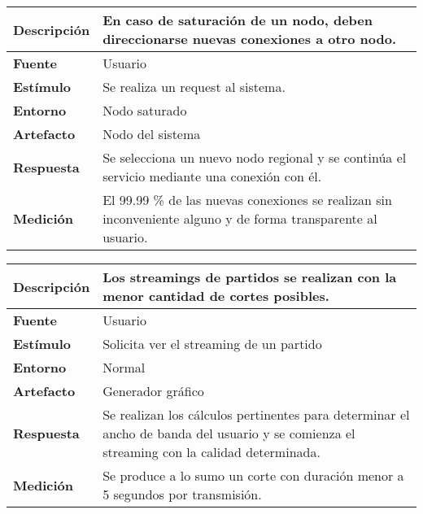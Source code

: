 \begin{center}
  \begin{tabular}{| l | p{10cm} | }
    \hline
	\textbf{Descripción} & En caso de saturación de un nodo, deben direccionarse nuevas conexiones a otro nodo.\\  \hline
	\textbf{Fuente} & Usuario\\ \hline
	\textbf{Estímulo} & Se realiza un request al sistema.\\  \hline
	\textbf{Entorno} & Nodo saturado\\  \hline
	\textbf{Artefacto} & Nodo del sistema\\  \hline
	\textbf{Respuesta} & Se selecciona un nuevo nodo regional y se continúa el servicio mediante una conexión con él.\\  \hline
	\textbf{Medición} & El 99.99 \% de las nuevas conexiones se realizan sin inconveniente alguno y de forma transparente al usuario.\\  \hline
  \end{tabular}
\end{center} 


\begin{center}
  \begin{tabular}{| l | p{10cm} | }
    \hline
	\textbf{Descripción} & Los streamings de partidos se realizan con la menor cantidad de cortes posibles.\\  \hline
	\textbf{Fuente} & Usuario\\  \hline
	\textbf{Estímulo} & Solicita ver el streaming de un partido\\  \hline
	\textbf{Entorno} & Normal\\  \hline
	\textbf{Artefacto} & Generador gráfico\\  \hline
	\textbf{Respuesta} & Se realizan los cálculos pertinentes para determinar el ancho de banda del usuario y se comienza el streaming con la calidad determinada.\\  \hline
	\textbf{Medición} & Se produce a lo sumo un corte con duración menor a 5 segundos por transmisión.\\  \hline
  \end{tabular}
\end{center}

